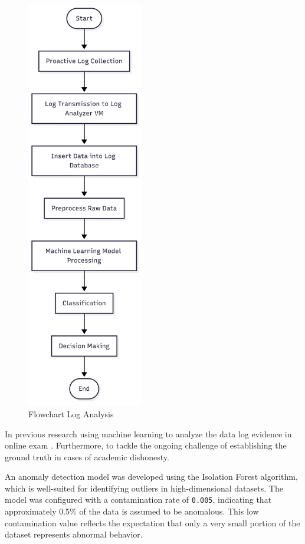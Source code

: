 \begin{figure}[H] 
	\centering
	\includegraphics[height=18cm]{figure/flow-analysis-data.png}
	\caption{Flowchart Log Analysis }
	\label{fig:flow-analysis-log}
\end{figure}

In previous research using machine learning to analyze the data log evidence in online exam \citet{garg2023preserving}. Furthermore, to tackle the ongoing challenge of establishing the ground truth in cases of academic dishonesty.

An anomaly detection model was developed using the Isolation Forest algorithm, which is well-suited for identifying outliers in high-dimensional datasets. The model was configured with a contamination rate of \texttt{0.005}, indicating that approximately 0.5\% of the data is assumed to be anomalous. This low contamination value reflects the expectation that only a very small portion of the dataset represents abnormal behavior.

